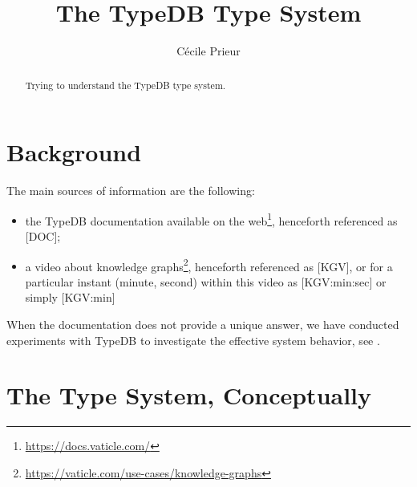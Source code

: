 \documentclass{article}
\begin{document}
\title{The TypeDB Type System}

\author{
Cécile Prieur
}
\maketitle

\begin{abstract}
Trying to understand the TypeDB type system.
\end{abstract}



\tableofcontents

\section{Background}\label{sec:background}

The main sources of information are the following:

\begin{itemize}
\item the TypeDB documentation available on the
  web\footnote{\url{https://docs.vaticle.com/}},
  henceforth referenced as [DOC];
\item a video about knowledge
  graphs\footnote{\url{https://vaticle.com/use-cases/knowledge-graphs}},
  henceforth referenced as [KGV], or for a particular instant (minute, second)
  within this video as [KGV:min:sec] or simply [KGV:min]
\end{itemize}

When the documentation does not
provide a unique answer, we have conducted experiments with TypeDB to
investigate the effective system behavior, see .


\section{The Type System, Conceptually}\label{sec:type_system_conceptually}
\end{document}
